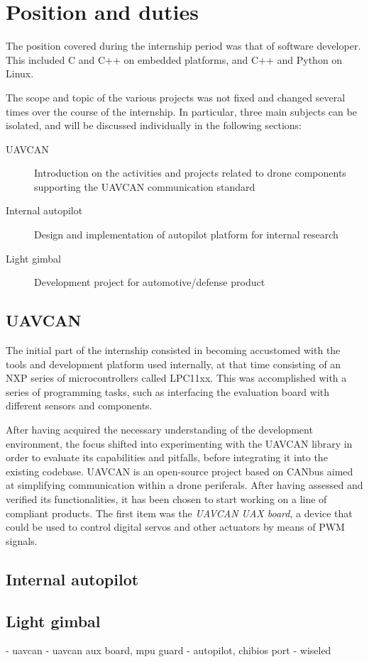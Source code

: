 \section{Position and duties}
The position covered during the internship period was that of software developer.
This included C and C++ on embedded platforms, and C++ and Python on Linux.

The scope and topic of the various projects was not fixed and changed several times over the course of the internship. 
In particular, three main subjects can be isolated, and will be discussed individually in the following sections:

\begin{description}  
\item [UAVCAN] Introduction on the activities and projects related to drone components supporting the UAVCAN communication standard
\item [Internal autopilot] Design and implementation of autopilot platform for internal research  
\item [Light gimbal] Development project for automotive/defense product 
\end{description}


\subsection{UAVCAN}
The initial part of the internship consisted in becoming accustomed with the tools and development platform used internally, at that time consisting of an NXP series of microcontrollers called LPC11xx.
This was accomplished with a series of programming tasks, such as interfacing the evaluation board with different sensors and components.

After having acquired the necessary understanding of the development environment, the focus shifted into experimenting with the UAVCAN library in order to evaluate its capabilities and pitfalls, before integrating it into the existing codebase.
UAVCAN is an open-source project based on CANbus aimed at simplifying communication within a drone periferals.
After having assessed and verified its functionalities, it has been chosen to start working on a line of compliant products.
The first item was the \emph{UAVCAN UAX board}, a device that could be used to control digital servos and other actuators by means of PWM signals.


\subsection{Internal autopilot}



\subsection{Light gimbal}




- uavcan
- uavcan aux board, mpu guard
- autopilot, chibios port
- wiseled